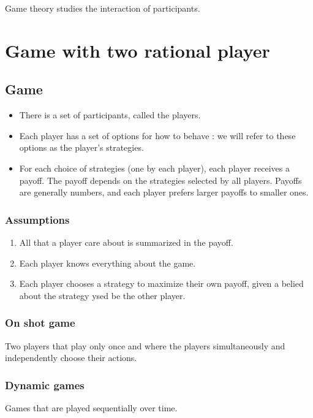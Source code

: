 Game theory studies the interaction of participants.

\section{Game with two rational player}

\subsection{Game}

\begin{itemize}
\item There is a set of participants, called the players.
\item Each player has a set of options for how to behave : we will refer to these options as the player's strategies.
\item For each choice of strategies (one by each player), each player receives a payoff. The payoff depends on the strategies selected by all players. Payoffs are generally numbers, and each player prefers larger payoffs to smaller ones.
\end{itemize}

\subsubsection{Assumptions}

\begin{enumerate}
\item All that a player care about is summarized in the payoff.
\item Each player knows everything about the game.
\item Each player chooses a strategy to maximize their own payoff, given a belied about the strategy ysed be the other player.
\end{enumerate}

\subsubsection{On shot game}

Two players that play only once and where the players simultaneously and independently choose their actions.

\subsubsection{Dynamic games}

Games that are played sequentially over time.

